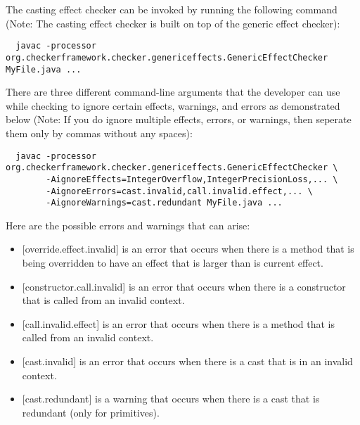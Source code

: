 
The casting effect checker can be invoked by running the following command (Note: The casting effect checker is built on top of the generic effect checker):
\begin{Verbatim}
  javac -processor org.checkerframework.checker.genericeffects.GenericEffectChecker MyFile.java ...
\end{Verbatim}

There are three different command-line arguments that the developer can use while checking to ignore certain effects, warnings, and errors as demonstrated below (Note: If you do ignore multiple effects, errors, or warnings, then seperate them only by commas without any spaces):
\begin{Verbatim}
  javac -processor org.checkerframework.checker.genericeffects.GenericEffectChecker \
        -AignoreEffects=IntegerOverflow,IntegerPrecisionLoss,... \
        -AignoreErrors=cast.invalid,call.invalid.effect,... \
        -AignoreWarnings=cast.redundant MyFile.java ...
\end{Verbatim}


Here are the possible errors and warnings that can arise:
\begin{itemize}
\item
{[override.effect.invalid]} is an error that occurs when there is a method that is being overridden to have an effect that is larger than is current effect.
\item
{[constructor.call.invalid]} is an error that occurs when there is a constructor that is called from an invalid context.
\item
{[call.invalid.effect]} is an error that occurs when there is a method that is called from an invalid context.
\item
{[cast.invalid]} is an error that occurs when there is a cast that is in an invalid context.
\item
{[cast.redundant]} is a warning that occurs when there is a cast that is redundant (only for primitives).
\end{itemize}
